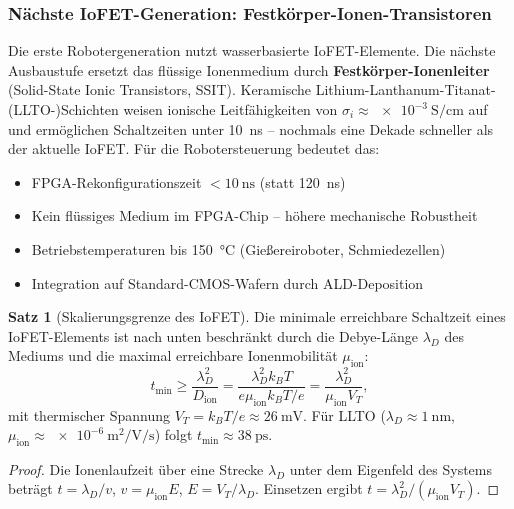﻿\documentclass[a4paper,12pt]{scrreprt}
\theoremstyle{definition}
\newtheorem{satz}{Satz}[section]
\begin{document}
\subsubsection{Nächste IoFET-Generation: Festkörper-Ionen-Transistoren}

Die erste Robotergeneration nutzt wasserbasierte IoFET-Elemente.
Die nächste Ausbaustufe ersetzt das flüssige Ionenmedium durch
\textbf{Festkörper-Ionenleiter} (Solid-State Ionic Transistors, SSIT).
Keramische Lithium-Lanthanum-Titanat-(LLTO-)Schichten weisen
ionische Leitfähigkeiten von $\sigma_i \approx \SI{e-3}{\siemens\per\centi\meter}$
auf und ermöglichen Schaltzeiten unter \SI{10}{\nano\second} --
nochmals eine Dekade schneller als der aktuelle IoFET.
Für die Robotersteuerung bedeutet das:
\begin{itemize}
  \item FPGA-Rekonfigurationszeit $< \SI{10}{\nano\second}$ (statt \SI{120}{\nano\second})
  \item Kein flüssiges Medium im FPGA-Chip -- höhere mechanische Robustheit
  \item Betriebstemperaturen bis \SI{150}{\celsius} (Gießereiroboter,
        Schmiedezellen)
  \item Integration auf Standard-CMOS-Wafern durch ALD-Deposition
\end{itemize}

\begin{satz}[Skalierungsgrenze des IoFET]
\label{satz:iofet_skalierung}
Die minimale erreichbare Schaltzeit eines IoFET-Elements ist
nach unten beschränkt durch die Debye-Länge $\lambda_D$ des
Mediums und die maximal erreichbare Ionenmobilität $\mu_{\text{ion}}$:
\begin{equation}
  t_{\min} \geq \frac{\lambda_D^2}{D_{\text{ion}}}
  = \frac{\lambda_D^2 k_B T}{e \mu_{\text{ion}} k_B T / e}
  = \frac{\lambda_D^2}{\mu_{\text{ion}} V_T},
\end{equation}
mit thermischer Spannung $V_T = k_BT/e \approx \SI{26}{\milli\volt}$.
Für LLTO ($\lambda_D \approx \SI{1}{\nano\meter}$,
$\mu_{\text{ion}} \approx \SI{e-6}{\meter\squared\per\volt\per\second}$)
folgt $t_{\min} \approx \SI{38}{\pico\second}$.
\end{satz}

\begin{proof}
Die Ionenlaufzeit über eine Strecke $\lambda_D$ unter dem Eigenfeld des
Systems beträgt $t = \lambda_D / v$, $v = \mu_{\text{ion}} E$,
$E = V_T / \lambda_D$. Einsetzen ergibt $t = \lambda_D^2/(\mu_{\text{ion}} V_T)$.
\end{proof}
\end{document}
